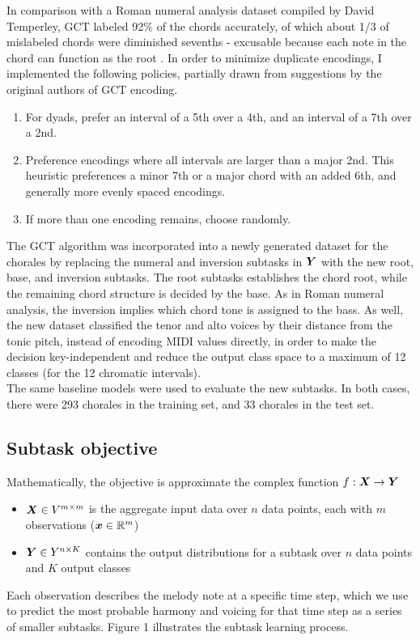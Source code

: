 \documentclass[11pt]{article}
\begin{document}
In comparison with a Roman numeral analysis dataset compiled by David Temperley, GCT labeled 92\% of the chords accurately, of which about 1/3 of mislabeled chords were diminished sevenths - excusable because each note in the chord can function as the root \citep[p.~3]{2015gct}. In order to minimize duplicate encodings, I implemented the following policies, partially drawn from suggestions by the original authors of GCT encoding.
\begin{enumerate}
\item For dyads, prefer an interval of a 5th over a 4th, and an interval of a 7th over a 2nd.
\item Preference encodings where all intervals are larger than a major 2nd. This heuristic preferences a minor 7th or a major chord with an added 6th, and generally more evenly spaced encodings.
\item If more than one encoding remains, choose randomly.
\end{enumerate}

The GCT algorithm was incorporated into a newly generated dataset for the chorales by replacing the numeral and inversion subtasks in $\boldsymbol{Y}$ with the new root, base, and inversion subtasks. The root subtasks establishes the chord root, while the remaining chord structure is decided by the base. As in Roman numeral analysis, the inversion implies which chord tone is assigned to the bass. As well, the new dataset classified the tenor and alto voices by their distance from the tonic pitch, instead of encoding MIDI values directly, in order to make the decision key-independent and reduce the output class space to a maximum of 12 classes (for the 12 chromatic intervals).\\

The same baseline models were used to evaluate the new subtasks. In both cases, there were 293 chorales in the training set, and 33 chorales in the test set.

\subsection{Subtask objective}

\noin Mathematically, the objective is approximate the complex function $f: \boldsymbol{X} \to \boldsymbol{Y}$
\begin{itemize}
\item $\boldsymbol{X} \in V^{m \times m}$ is the aggregate input data over $n$ data points, each with $m$ observations ($\boldsymbol{x} \in \mathbb{R}^m$)
\item $\boldsymbol{Y} \in Y^{n \times K}$ contains the output distributions for a subtask over $n$ data points and $K$ output classes
\end{itemize}
Each observation describes the melody note at a specific time step, which we use to predict the most probable harmony and voicing for that time step as a series of smaller subtasks.  Figure 1 illustrates the subtask learning process.
\end{document}
